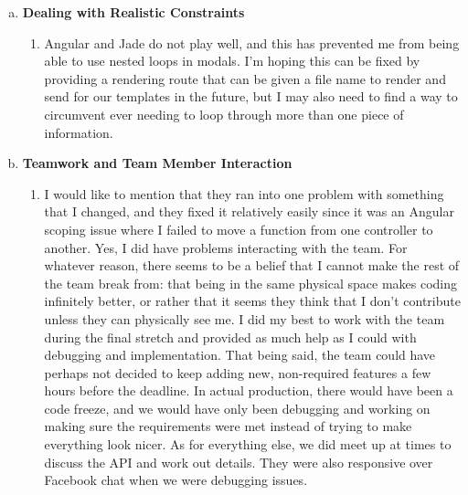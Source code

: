 \documentclass[11pt]{article}   %
\begin{document}
\begin{enumerate} [a)]
\begin{enumerate} [$\cdot$]
\end{enumerate}
\item {\bf Dealing with Realistic Constraints}
\begin{enumerate} [$\cdot$]
\item Angular and Jade do not play well, and this has prevented me from being able to use nested loops in modals. I'm hoping this can be fixed by providing a rendering route that can be given a file name to render and send for our templates in the future, but I may also need to find a way to circumvent ever needing to loop through more than one piece of information.
\end{enumerate}
\item  {\bf Teamwork and Team Member Interaction}
\begin{enumerate} [$\cdot$]
\item I would like to mention that they ran into one problem with something that I changed, and they fixed it relatively easily since it was an Angular scoping issue where I failed to move a function from one controller to another. Yes, I did have problems interacting with the team. For whatever reason, there seems to be a belief that I cannot make the rest of the team break from: that being in the same physical space makes coding infinitely better, or rather that it seems they think that I don't contribute unless they can physically see me. I did my best to work with the team during the final stretch and provided as much help as I could with debugging and implementation. That being said, the team could have perhaps not decided to keep adding new, non-required features a few hours before the deadline. In actual production, there would have been a code freeze, and we would have only been debugging and working on making sure the requirements were met instead of trying to make everything look nicer. As for everything else, we did meet up at times to discuss the API and work out details. They were also responsive over Facebook chat when we were debugging issues.
\end{enumerate}
\end{enumerate}






\end{document}
